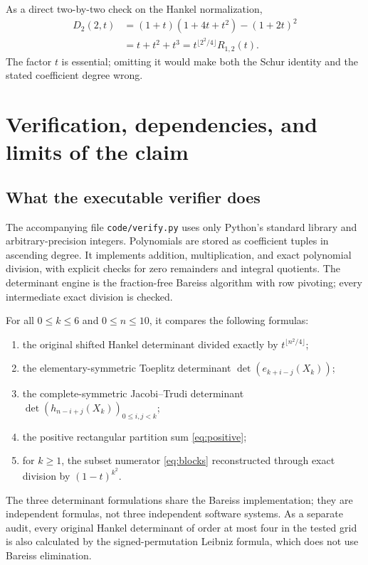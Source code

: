 \documentclass[11pt,a4paper]{article}
\theoremstyle{definition}
\theoremstyle{remark}
\numberwithin{equation}{section}
\begin{document}
As a direct two-by-two check on the Hankel normalization,
\begin{align*}
 D_2(2,t)&=(1+t)(1+4t+t^2)-(1+2t)^2\\
        &=t+t^2+t^3=t^{\lfloor 2^2/4\rfloor}R_{1,2}(t).
\end{align*}
The factor \(t\) is essential; omitting it would make both the Schur
identity and the stated coefficient degree wrong.

\section{Verification, dependencies, and limits of the claim}
\label{sec:verification}

\subsection{What the executable verifier does}
The accompanying file \texttt{code/verify.py} uses only Python's standard
library and arbitrary-precision integers. Polynomials are stored as
coefficient tuples in ascending degree. It implements addition,
multiplication, and exact polynomial division, with explicit checks for
zero remainders and integral quotients. The determinant engine is the
fraction-free Bareiss algorithm with row pivoting; every intermediate
exact division is checked.

For all \(0\le k\le6\) and \(0\le n\le10\), it compares the following
formulas:
\begin{enumerate}[label=(\arabic*)]
\item the original shifted Hankel determinant divided exactly by
      \(t^{\lfloor n^2/4\rfloor}\);
\item the elementary-symmetric Toeplitz determinant
      \(\det(e_{k+i-j}(X_k))\);
\item the complete-symmetric Jacobi--Trudi determinant
      \(\det(h_{n-i+j}(X_k))_{0\le i,j<k}\);
\item the positive rectangular partition sum \eqref{eq:positive};
\item for \(k\ge1\), the subset numerator \eqref{eq:blocks} reconstructed
      through exact division by \((1-t)^{k^2}\).
\end{enumerate}
The three determinant formulations share the Bareiss implementation;
they are independent formulas, not three independent software systems.
As a separate audit, every original Hankel determinant of order at most
four in the tested grid is also calculated by the signed-permutation
Leibniz formula, which does not use Bareiss elimination.
\end{document}
